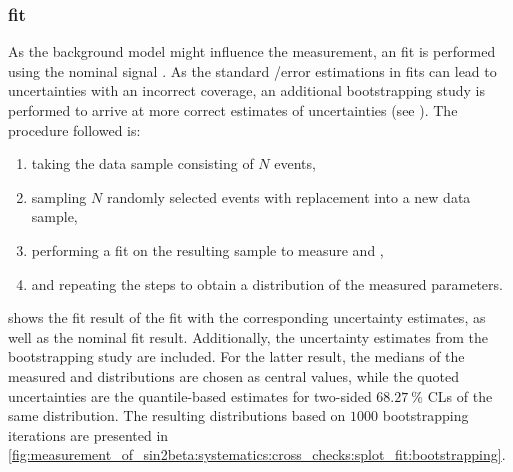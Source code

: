 \subsubsection{\sPlot fit}
\label{sec:measurement_of_sin2beta:systematics:cross_checks:splot_fit}
%
As the background model might influence the measurement, an \sPlot fit is
performed using the nominal signal \PDF. As the standard \Minuit/\Hesse error
estimations in \sPlot fits can lead to uncertainties with an incorrect coverage,
an additional bootstrapping study is performed to arrive at more correct
estimates of uncertainties (see \eg \cite{Behnke:2013pga}). The procedure
followed is:
%
\begin{enumerate}
  \item taking the \sweighted data sample consisting of $N$ events,
  \item sampling $N$ randomly selected events with replacement into a new data sample,
  \item performing a fit on the resulting sample to measure \SJpsiKS and \CJpsiKS,
  \item and repeating the steps to obtain a distribution of the measured \CP parameters.
\end{enumerate}
%
shows the fit result of the \sPlot fit with the corresponding \Hesse uncertainty
estimates, as well as the nominal fit result. Additionally, the uncertainty
estimates from the bootstrapping study are included. For the latter result, the
medians of the measured \SJpsiKS and \CJpsiKS distributions are chosen as
central values, while the quoted uncertainties are the quantile-based estimates
for two-sided $\SI{68.27}{\percent}$ \acp{CL} of the same distribution. The
resulting distributions based on $\num{1000}$ bootstrapping iterations are
presented in
\cref{fig:measurement_of_sin2beta:systematics:cross_checks:splot_fit:bootstrapping}.


